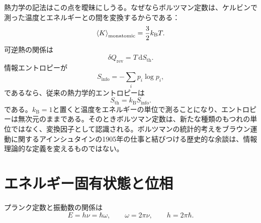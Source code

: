 \begin{classroomqa}
\end{classroomqa}

熱力学の記法はこの点を曖昧にしうる。なぜならボルツマン定数は、ケルビンで測った温度とエネルギーとの間を変換するからである：
\begin{equation}
\left\langle K\right\rangle_{\mathrm{monatomic}}
=\frac32 k_{\mathrm B}T.
\end{equation}
可逆熱の関係は
\begin{equation}
\delta Q_{\mathrm{rev}}=T\,\mathrm dS_{\mathrm{th}}.
\end{equation}
情報エントロピーが
\begin{equation}
S_{\mathrm{info}}=-\sum_i p_i\log p_i,
\end{equation}
であるなら、従来の熱力学的エントロピーは
\begin{equation}
S_{\mathrm{th}}=k_{\mathrm B}S_{\mathrm{info}}.
\end{equation}
である。\(k_{\mathrm B}=1\)と置くと温度をエネルギーの単位で測ることになり、エントロピーは無次元のままである。そのときボルツマン定数は、新たな種類のもつれの単位ではなく、変換因子として認識される。ボルツマンの統計的考えをブラウン運動に関するアインシュタインの1905年の仕事と結びつける歴史的な余談は、情報理論的な定義を変えるものではない。

\section{エネルギー固有状態と位相}

\begin{classroomqa}
\end{classroomqa}

プランク定数と振動数の関係は
\begin{equation}
E=h\nu=\hbar\omega,
\qquad
\omega=2\pi\nu,
\qquad
h=2\pi\hbar.
\end{equation}

